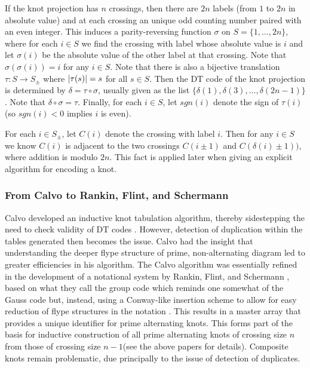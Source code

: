 If the knot projection has $n$ crossings, then there are $2n$ labels
(from $1$ to $2n$ in absolute value) and at each crossing an unique
odd counting number paired with an even integer. This induces a
parity-reversing function $\sigma$ on $S= \{1,\ldots,2n\}$, where for
each $i\in S$ we find the crossing with label whose absolute value is $i$ and let
$\sigma(i)$ be the absolute value of the other label at that crossing.
Note that $\sigma(\sigma(i))=i$ for any $i\in S$. Note that there is
also a bijective translation $\tau: S\to S_\pm$ where
$\left\vert\tau(s)\right\vert=s$ for all $s\in S$.  Then the DT code of the knot
projection is determined by $\delta=\tau\circ\sigma$, usually given as
the list $\{\delta(1),\delta(3),\ldots,\delta(2n-1)\}$. Note that
$\delta\circ\sigma=\tau$. Finally, for each $i\in S$, let $sgn(i)$
denote the sign of $\tau(i)$ (so $sgn(i)<0$ implies $i$ is even).

For each $i\in S_\pm$, let $C(i)$ denote the crossing with label
$i$. Then for any $i\in S$ we know $C(i)$ is adjacent to the two
crossings $C(i\pm 1)$ and $C(\delta(i)\pm 1))$, where addition is modulo $2n$. This fact is applied
later when giving an explicit algorithm for encoding a knot.


 
\subsubsection{From Calvo to Rankin, Flint, and Schermann} Calvo
developed an inductive knot tabulation algorithm, thereby sidestepping the need to
check validity of DT codes \cite{Calvo1997Knot-enumeratio}. However, detection of
duplication within the tables generated then becomes the issue. Calvo had the insight that
understanding the deeper flype structure of prime, non-alternating
diagram led to greater efficiencies in his algorithm. The Calvo
algorithm was essentially refined in the development of a notational
system by Rankin, Flint, and Schermann , based on what they call
the group code which reminds one somewhat of the Gauss code but, instead, using a
Conway-like insertion scheme to allow for easy reduction of flype
structures in the notation \cite{Rankin2004Enumerating-I}
\cite{Rankin2004Enumerating-II} \cite{Rankin2004EnumeratingLinks}. This results in a master array that provides a unique identifier for  prime alternating knots. This forms part of the basis for inductive construction of all prime alternating knots of crossing size $n$ from those of crossing size $n-1$(see the above papers for details).  Composite knots remain problematic, due principally to the issue of detection of duplicates.




